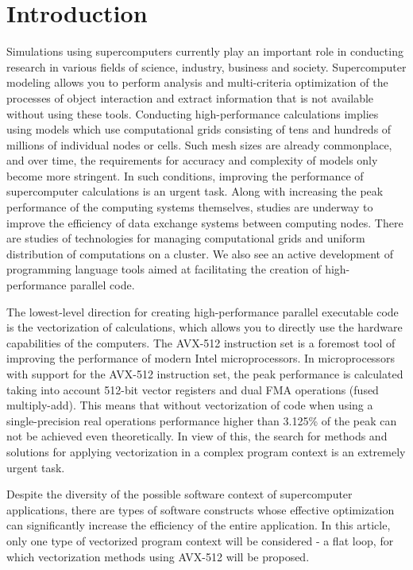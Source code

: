 \documentclass[
11pt,%
tightenlines,%
twoside,%
onecolumn,%
nofloats,%
nobibnotes,%
nofootinbib,%
superscriptaddress,%
noshowpacs,%
centertags]%
{revtex4}
\begin{document}
\maketitle

\section{Introduction}

Simulations using supercomputers currently play an important role in conducting research in various fields of science, industry, business and society.
Supercomputer modeling allows you to perform analysis and multi-criteria optimization of the processes of object interaction and extract information that is not available without using these tools.
Conducting high-performance calculations implies using models which use computational grids consisting of tens and hundreds of millions of individual nodes or cells.
Such mesh sizes are already commonplace, and over time, the requirements for accuracy and complexity of models only become more stringent.
In such conditions, improving the performance of supercomputer calculations is an urgent task.
Along with increasing the peak performance of the computing systems themselves, studies are underway to improve the efficiency of data exchange systems between computing nodes. There are studies of technologies for managing computational grids and uniform distribution of computations on a cluster. We also see an active development of programming language tools aimed at facilitating the creation of high-performance parallel code.

The lowest-level direction for creating high-performance parallel executable code is the vectorization of calculations, which allows you to directly use the hardware capabilities of the computers.
The AVX-512 instruction set is a foremost tool of improving the performance of modern Intel microprocessors.
In microprocessors with support for the AVX-512 instruction set, the peak performance is calculated taking into account 512-bit vector registers and dual FMA operations (fused multiply-add).
This means that without vectorization of code when using a single-precision real operations performance higher than 3.125\% of the peak can not be achieved even theoretically.
In view of this, the search for methods and solutions for applying vectorization in a complex program context is an extremely urgent task.

Despite the diversity of the possible software context of supercomputer applications, there are types of software constructs whose effective optimization can significantly increase the efficiency of the entire application.
In this article, only one type of vectorized program context will be considered - a flat loop, for which vectorization methods using AVX-512 will be proposed.
\end{document}
